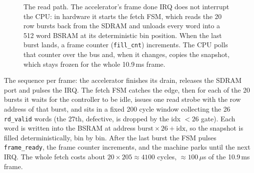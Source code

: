 \documentclass[a4paper,11pt]{article}
\begin{document}
\begin{figure}[H]
\centering
{}
\caption{The read path. The accelerator's frame done IRQ does not interrupt the
CPU: in hardware it starts the fetch FSM, which reads the 20 row bursts back from
the SDRAM and unloads every word into a 512 word BSRAM at its deterministic bin
position. When the last burst lands, a frame counter (\texttt{fill\_cnt})
increments. The CPU polls that counter over the bus and, when it changes, copies
the snapshot, which stays frozen for the whole 10.9\,ms frame.}
\label{fig:fetch-path}
\end{figure}

The sequence per frame: the accelerator finishes its drain, releases the SDRAM
port and pulses the IRQ. The fetch FSM catches the edge, then for each of the 20
bursts it waits for the controller to be idle, issues one read strobe with the
row address of that burst, and sits in a fixed 200 cycle window collecting the
26 \texttt{rd\_valid} words (the 27th, defective, is dropped by the idx $<26$
gate). Each word is written into the BSRAM at address
$\mathrm{burst}\times 26 + \mathrm{idx}$, so the snapshot is filled
deterministically, bin by bin. After the last burst the FSM pulses
\texttt{frame\_ready}, the frame counter increments, and the machine parks until
the next IRQ. The whole fetch costs about $20\times205 \approx 4100$ cycles,
$\approx 100\,\mu$s of the 10.9\,ms frame.
\end{document}
